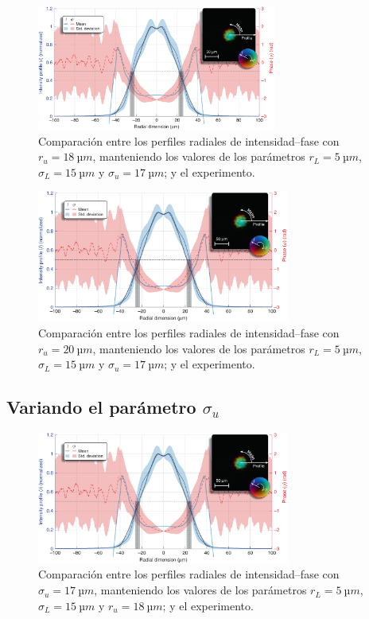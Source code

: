 \begin{figure}[htbp]
  \centering
  \includegraphics[width=0.7\textwidth]{Figuras/anx_cmp_83.png}
  \caption*{Comparación entre los perfiles radiales de intensidad--fase con $r_{u}=\qty{18}{µm}$, manteniendo los valores de los parámetros $r_{L}=\qty{5}{µm}$, $\sigma_{L}=\qty{15}{µm}$ y $\sigma_{u}=\qty{17}{µm}$; y el experimento.}
\end{figure}

\begin{figure}[htbp]
  \centering
  \includegraphics[width=0.74\textwidth]{Figuras/anx_cmp_84.png}
  \caption*{Comparación entre los perfiles radiales de intensidad--fase con $r_{u}=\qty{20}{µm}$, manteniendo los valores de los parámetros $r_{L}=\qty{5}{µm}$, $\sigma_{L}=\qty{15}{µm}$ y $\sigma_{u}=\qty{17}{µm}$; y el experimento.}
\end{figure}

\subsection*{Variando el parámetro \texorpdfstring{$\sigma_{u}$}{sigma-u}}

\begin{figure}[htbp!]
  \centering
  \includegraphics[width=0.74\textwidth]{Figuras/anx_cmp_91.png}
  \caption*{Comparación entre los perfiles radiales de intensidad--fase con $\sigma_{u}=\qty{17}{µm}$, manteniendo los valores de los parámetros $r_{L}=\qty{5}{µm}$, $\sigma_{L}=\qty{15}{µm}$ y $r_{u}=\qty{18}{µm}$; y el experimento.}
\end{figure}


